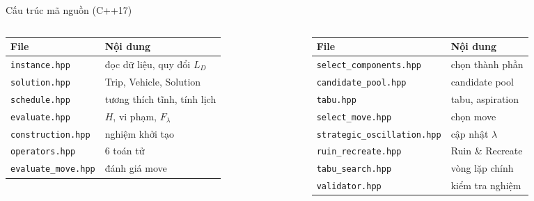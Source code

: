 \documentclass[aspectratio=169]{beamer}
\begin{document}
\begin{frame}{Cấu trúc mã nguồn (C++17)}
  \begin{columns}[T]
    \begin{column}{0.5\textwidth}
      \footnotesize
      \begin{tabular}{@{}ll@{}}
        \toprule
        File & Nội dung \\
        \midrule
        \texttt{instance.hpp} & đọc dữ liệu, quy đổi $L_D$ \\
        \texttt{solution.hpp} & Trip, Vehicle, Solution \\
        \texttt{schedule.hpp} & tương thích tĩnh, tính lịch \\
        \texttt{evaluate.hpp} & $H$, vi phạm, $F_\lambda$ \\
        \texttt{construction.hpp} & nghiệm khởi tạo \\
        \texttt{operators.hpp} & 6 toán tử \\
        \texttt{evaluate\_move.hpp} & đánh giá move \\
        \bottomrule
      \end{tabular}
    \end{column}
    \begin{column}{0.5\textwidth}
      \footnotesize
      \begin{tabular}{@{}ll@{}}
        \toprule
        File & Nội dung \\
        \midrule
        \texttt{select\_components.hpp} & chọn thành phần \\
        \texttt{candidate\_pool.hpp} & candidate pool \\
        \texttt{tabu.hpp} & tabu, aspiration \\
        \texttt{select\_move.hpp} & chọn move \\
        \texttt{strategic\_oscillation.hpp} & cập nhật $\lambda$ \\
        \texttt{ruin\_recreate.hpp} & Ruin \& Recreate \\
        \texttt{tabu\_search.hpp} & vòng lặp chính \\
        \texttt{validator.hpp} & kiểm tra nghiệm \\
        \bottomrule
      \end{tabular}
    \end{column}
  \end{columns}
\end{frame}
\end{document}
